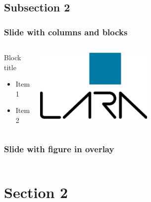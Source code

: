 \documentclass[hyperref={pdfpagelabels=false}]{beamer}
\begin{document}
\subsection{Subsection 2}
\frame 
{
  \frametitle{Slide with columns and blocks}
  \vspace{25pt}
  \begin{columns}[c]
    \begin{block}{Block title}
      \begin{itemize}
	\item Item 1
	\item Item 2
	\end{itemize}
    \end{block}
      \includegraphics[width=0.5\textwidth]{LARA_logo.eps}
   \end{columns}
}
\frame 
{
  \frametitle{Slide with figure in overlay}
  \begin{columns}[c]
       \pause
   \end{columns}
}
\section{Section 2}
\end{document}

